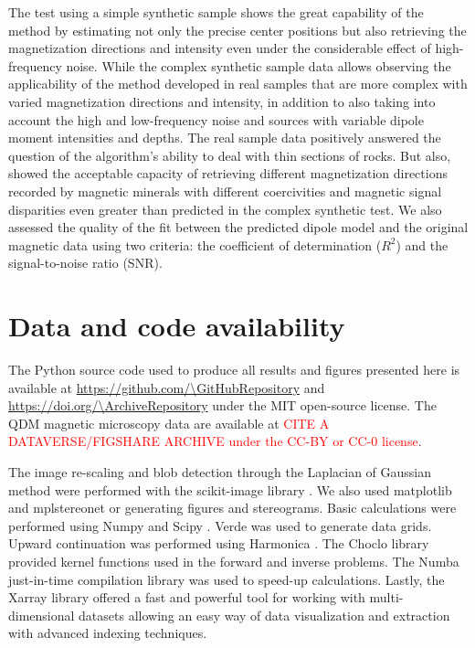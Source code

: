 The test using a simple synthetic sample shows the great capability of the method by estimating not only the precise center positions but also retrieving the magnetization directions and intensity even under the considerable effect of high-frequency noise.
While the complex synthetic sample data allows observing the applicability of the method developed in real samples that are more complex with varied magnetization directions and intensity, in addition to also taking into account the high and low-frequency noise and sources with variable dipole moment intensities and depths.
The real sample data positively answered the question of the algorithm's ability to deal with thin sections of rocks.
But also, showed the acceptable capacity of retrieving different magnetization directions recorded by magnetic minerals with different coercivities and magnetic signal disparities even greater than predicted in the complex synthetic test.
We also assessed the quality of the fit between the predicted dipole model and the original magnetic data using two criteria: the coefficient of determination ($R^2$) and the signal-to-noise ratio (SNR).

\section{Data and code availability}

The Python source code used to produce all results and figures presented here
is available at \url{https://github.com/\GitHubRepository} and
\url{https://doi.org/\ArchiveRepository} under the MIT open-source license.
The QDM magnetic microscopy data are available at \textcolor{red}{CITE A
DATAVERSE/FIGSHARE ARCHIVE under the CC-BY or CC-0 license}.

The image re-scaling and blob detection through the Laplacian of Gaussian
method were performed with the scikit-image library \citep{VanderWalt2014}.
We also used matplotlib \citep{Hunter2007} and mplstereonet \citep{mplstereonet}
or generating figures and stereograms.
Basic calculations were performed using Numpy \citep{Harris2020} and Scipy
\citep{2020SciPy-NMeth}.
Verde \citep{verde2018} was used to generate data grids.
Upward continuation was performed using Harmonica \citep{harmonica2020}.
The Choclo library \citep{choclo2022} provided kernel functions used in the
forward and inverse problems.
The Numba just-in-time compilation library \citep{lam2015numba} was used to
speed-up calculations.
Lastly, the Xarray library \citep{hoyer2017xarray} offered a fast and powerful
tool for working with multi-dimensional datasets allowing an easy way of data
visualization and extraction with advanced indexing techniques.


